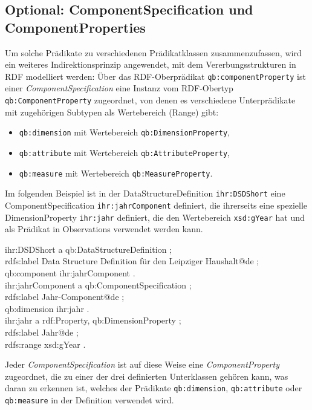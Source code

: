\documentclass[a4paper,11pt,twoside]{article}
\begin{document}
\subsection{Optional: ComponentSpecification und ComponentProperties}

Um solche Prädikate zu verschiedenen Prädikatklassen zusammenzufassen, wird ein
weiteres Indirektionsprinzip angewendet, mit dem Vererbungsstrukturen in RDF
modelliert werden: Über das RDF-Oberprädikat \texttt{qb:componentProperty} ist
einer \emph{ComponentSpecification} eine Instanz vom RDF-Obertyp
\texttt{qb:ComponentProperty} zugeordnet, von denen es verschiedene
Unterprädikate mit zugehörigen Subtypen als Wertebereich (Range) gibt:
\begin{itemize}\itemsep0pt
\item \texttt{qb:dimension} mit Wertebereich \texttt{qb:DimensionProperty},
\item \texttt{qb:attribute} mit Wertebereich \texttt{qb:AttributeProperty},
\item \texttt{qb:measure} mit Wertebereich \texttt{qb:MeasureProperty}.
\end{itemize}
Im folgenden Beispiel ist in der DataStructureDefinition \texttt{ihr:DSDShort}
eine ComponentSpecification \texttt{ihr:jahrComponent} definiert, die
ihrerseits eine spezielle DimensionProperty \texttt{ihr:jahr} definiert, die
den Wertebereich \texttt{xsd:gYear} hat und als Prädikat in Observations
verwendet werden kann.
\begin{code}
ihr:DSDShort a qb:DataStructureDefinition ;\+\\
  rdfs:label {\dq}Data Structure Definition für den Leipziger Haushalt{\dq}@de
  ;\\ 
  qb:component ihr:jahrComponent .\-\\[6pt]
ihr:jahrComponent a qb:ComponentSpecification ;\+\\
  rdfs:label {\dq}Jahr-Component{\dq}@de ;\\
  qb:dimension ihr:jahr .\-\\[6pt]
ihr:jahr a rdf:Property, qb:DimensionProperty ;\+\\
  rdfs:label {\dq}Jahr{\dq}@de ;\\
  rdfs:range xsd:gYear .
\end{code}
Jeder \emph{ComponentSpecification} ist auf diese Weise eine
\emph{ComponentProperty} zugeordnet, die zu einer der drei definierten
Unterklassen gehören kann, was daran zu erkennen ist, welches der Prädikate
\texttt{qb:dimension}, \texttt{qb:attribute} oder \texttt{qb:measure} in der
Definition verwendet wird.  
\end{document}
